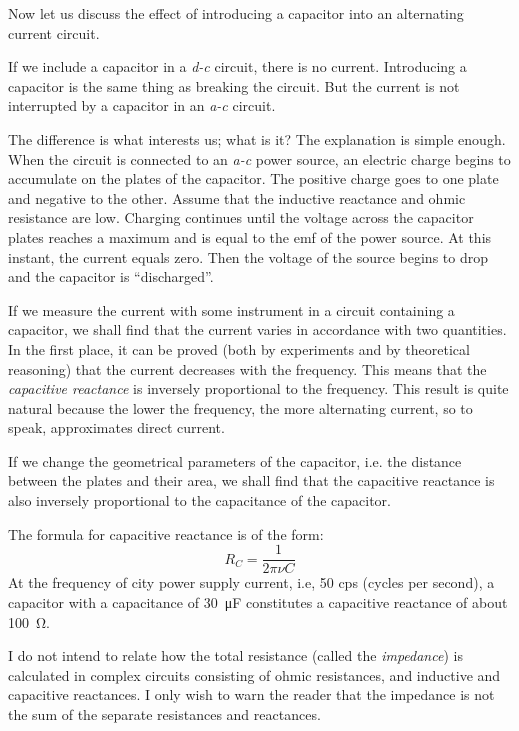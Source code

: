 Now let us discuss the effect of introducing a capacitor into an alternating current circuit.

If we include a capacitor in a \emph{d-c} circuit, there is no current. Introducing a capacitor is the same thing as breaking the circuit. But the current is not interrupted by a capacitor in an \emph{a-c} circuit.

The difference is what interests us; what is it? The explanation is simple enough. When the circuit is connected to an \emph{a-c} power source, an electric charge begins to accumulate on the plates of the capacitor. The positive charge goes to one plate and negative to the other. Assume that the inductive reactance and ohmic resistance are low. Charging continues until the voltage across the capacitor plates reaches a maximum and is equal to the emf of the power source. At this instant, the current equals zero. Then the voltage of the source begins to drop and the capacitor is ``discharged''.

If we measure the current with some instrument in a circuit containing a capacitor, we shall find that the current varies in accordance with two quantities. In the first place, it can be proved (both by experiments and by theoretical reasoning) that the current decreases with the frequency. This means that the \emph{capacitive reactance} is inversely proportional to the frequency. This result is quite natural because the lower the frequency, the more alternating current, so to speak, approximates direct current.

If we change the geometrical parameters of the capacitor, i.e. the distance between the plates and their area, we shall find that the capacitive reactance is also inversely proportional to the capacitance of the capacitor.

The formula for capacitive reactance is of the form: 
\begin{equation*}%
R_{C}= \frac{1}{2\pi \nu C}
\end{equation*}
At the frequency of city power supply current, i.e, 50 cps (cycles per second), a capacitor with a capacitance of \SI{30}{\micro\farad} constitutes a capacitive reactance of about \SI{100}{\ohm}.

I do not intend to relate how the total resistance (called the \emph{impedance}) is calculated in complex circuits consisting of ohmic resistances, and inductive and capacitive reactances. I only wish to warn the reader that the impedance is not the sum of the separate resistances and reactances.

